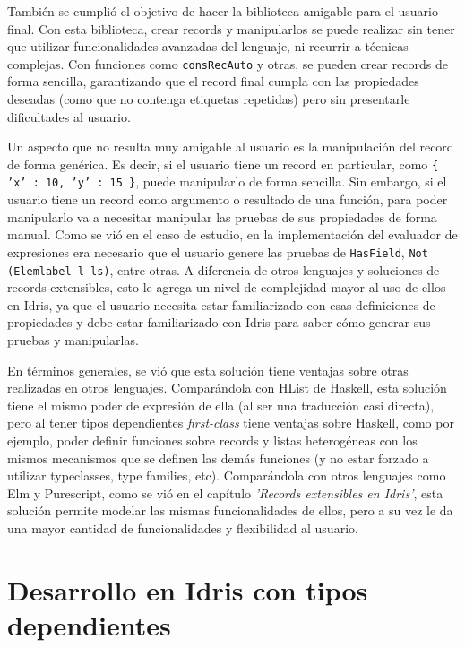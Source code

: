 También se cumplió el objetivo de hacer la biblioteca amigable para el usuario final. Con esta biblioteca, crear records y manipularlos se puede realizar sin tener que utilizar funcionalidades avanzadas del lenguaje, ni recurrir a técnicas complejas. Con funciones como \texttt{consRecAuto} y otras, se pueden crear records de forma sencilla, garantizando que el record final cumpla con las propiedades deseadas (como que no contenga etiquetas repetidas) pero sin presentarle dificultades al usuario.

Un aspecto que no resulta muy amigable al usuario es la manipulación del record de forma genérica. Es decir, si el usuario tiene un record en particular, como \texttt{\{ 'x' : 10, 'y' : 15 \}}, puede manipularlo de forma sencilla. Sin embargo, si el usuario tiene un record como argumento o resultado de una función, para poder manipularlo va a necesitar manipular las pruebas de sus propiedades de forma manual. Como se vió en el caso de estudio, en la implementación del evaluador de expresiones era necesario que el usuario genere las pruebas de \texttt{HasField}, \texttt{Not (Elemlabel l ls)}, entre otras. A diferencia de otros lenguajes y soluciones de records extensibles, esto le agrega un nivel de complejidad mayor al uso de ellos en Idris, ya que el usuario necesita estar familiarizado con esas definiciones de propiedades y debe estar familiarizado con Idris para saber cómo generar sus pruebas y manipularlas.

En términos generales, se vió que esta solución tiene ventajas sobre otras realizadas en otros lenguajes. Comparándola con HList de Haskell, esta solución tiene el mismo poder de expresión de ella (al ser una traducción casi directa), pero al tener tipos dependientes \textit{first-class} tiene ventajas sobre Haskell, como por ejemplo, poder definir funciones sobre records y listas heterogéneas con los mismos mecanismos que se definen las demás funciones (y no estar forzado a utilizar typeclasses, type families, etc). Comparándola con otros lenguajes como Elm y Purescript, como se vió en el capítulo \textit{'Records extensibles en Idris'}, esta solución permite modelar las mismas funcionalidades de ellos, pero a su vez le da una mayor cantidad de funcionalidades y flexibilidad al usuario.

\section{Desarrollo en Idris con tipos dependientes}

